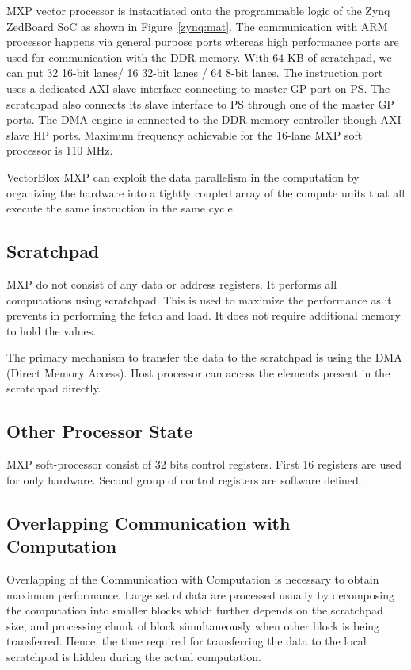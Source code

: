 MXP vector processor is instantiated onto the programmable logic of the Zynq ZedBoard SoC as shown in Figure~\ref{zynq:mat}. The communication with ARM processor happens via general purpose ports whereas high performance ports are used for communication with the DDR memory. With 64 KB of scratchpad, we can put 32 16-bit lanes/ 16 32-bit lanes / 64 8-bit lanes. The instruction port uses a dedicated AXI slave interface connecting to master GP port on PS. The scratchpad also connects its slave interface to PS through one of the master GP ports. The DMA engine is connected to the DDR memory controller though AXI slave HP ports. Maximum frequency achievable for the 16-lane MXP soft processor is 110 MHz.

VectorBlox MXP can exploit the data parallelism in the computation by organizing the hardware into a tightly coupled array of the compute units that all execute the same instruction in the same cycle.

\subsection{Scratchpad}
MXP do not consist of any data or address registers. It performs all computations using scratchpad. This is used to maximize the performance as it prevents in performing the fetch and load. It does not require additional memory to hold the values.

The primary mechanism to transfer the data to the scratchpad is using the DMA (Direct Memory Access). Host processor can access the elements present in the scratchpad directly.

\subsection{Other Processor State}
MXP soft-processor consist of 32 bits control registers. First 16 registers are used for only hardware. Second group of control registers are software defined.

\subsection{Overlapping Communication with Computation}
Overlapping of the Communication with Computation is necessary to obtain maximum performance. Large set of data are processed usually by decomposing the computation into smaller blocks which further depends on the scratchpad size, and processing chunk of block simultaneously when other block is being transferred. Hence, the time required for transferring the data to the local scratchpad is hidden during the actual computation.   


